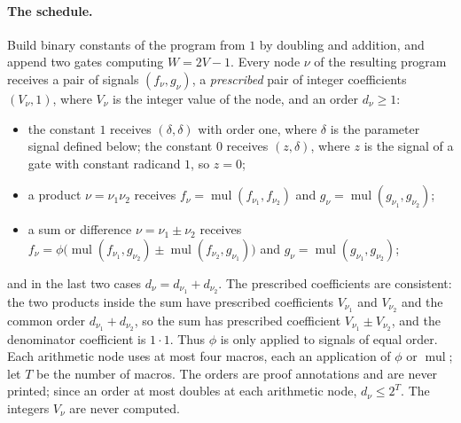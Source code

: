 \paragraph{The schedule.}
Build binary constants of the program from $1$ by doubling and addition, and
append two gates computing $W=2V-1$. Every node $\nu$ of the resulting program
receives a pair of signals $(f_\nu,g_\nu)$, a \emph{prescribed} pair of integer
coefficients $(V_\nu,1)$, where $V_\nu$ is the integer value of the node, and an
order $d_\nu\ge1$:
\begin{itemize}
\item the constant $1$ receives $(\delta,\delta)$ with order one, where $\delta$
is the parameter signal defined below; the constant $0$ receives $(z,\delta)$,
where $z$ is the signal of a gate with constant radicand $1$, so $z=0$;
\item a product $\nu=\nu_1\nu_2$ receives
$f_\nu=\operatorname{mul}(f_{\nu_1},f_{\nu_2})$ and
$g_\nu=\operatorname{mul}(g_{\nu_1},g_{\nu_2})$;
\item a sum or difference $\nu=\nu_1\pm\nu_2$ receives
$f_\nu=\phi\bigl(\operatorname{mul}(f_{\nu_1},g_{\nu_2})\pm
\operatorname{mul}(f_{\nu_2},g_{\nu_1})\bigr)$ and
$g_\nu=\operatorname{mul}(g_{\nu_1},g_{\nu_2})$;
\end{itemize}
and in the last two cases $d_\nu=d_{\nu_1}+d_{\nu_2}$. The prescribed
coefficients are consistent: the two products inside the sum have prescribed
coefficients $V_{\nu_1}$ and $V_{\nu_2}$ and the common order
$d_{\nu_1}+d_{\nu_2}$, so the sum has prescribed coefficient
$V_{\nu_1}\pm V_{\nu_2}$, and the denominator coefficient is $1\cdot1$. Thus
$\phi$ is only applied to signals of equal order. Each arithmetic node uses at
most four macros, each an application of $\phi$ or $\operatorname{mul}$; let $T$
be the number of macros. The orders are proof annotations and are never
printed; since an order at most doubles at each arithmetic node, $d_\nu\le2^T$.
The integers $V_\nu$ are never computed.

